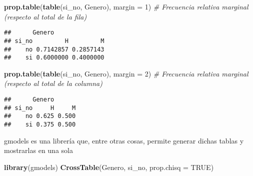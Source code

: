 \documentclass[]{article}
\newenvironment{Shaded}{\begin{snugshade}}{\end{snugshade}}
\newcommand{\CommentTok}[1]{\textcolor[rgb]{0.56,0.35,0.01}{\textit{#1}}}
\newcommand{\DataTypeTok}[1]{\textcolor[rgb]{0.13,0.29,0.53}{#1}}
\newcommand{\DecValTok}[1]{\textcolor[rgb]{0.00,0.00,0.81}{#1}}
\newcommand{\KeywordTok}[1]{\textcolor[rgb]{0.13,0.29,0.53}{\textbf{#1}}}
\newcommand{\NormalTok}[1]{#1}
\newcommand{\OtherTok}[1]{\textcolor[rgb]{0.56,0.35,0.01}{#1}}
\begin{document}
\begin{Shaded}
\begin{Highlighting}[]
\KeywordTok{prop.table}\NormalTok{(}\KeywordTok{table}\NormalTok{(si_no, Genero), }\DataTypeTok{margin =} \DecValTok{1}\NormalTok{) }\CommentTok{# Frecuencia relativa marginal (respecto al total de la fila)}
\end{Highlighting}
\end{Shaded}

\begin{verbatim}
##      Genero
## si_no         H         M
##    no 0.7142857 0.2857143
##    si 0.6000000 0.4000000
\end{verbatim}

\begin{Shaded}
\begin{Highlighting}[]
\KeywordTok{prop.table}\NormalTok{(}\KeywordTok{table}\NormalTok{(si_no, Genero), }\DataTypeTok{margin =} \DecValTok{2}\NormalTok{) }\CommentTok{# Frecuencia relativa marginal (respecto al total de la columna)}
\end{Highlighting}
\end{Shaded}

\begin{verbatim}
##      Genero
## si_no     H     M
##    no 0.625 0.500
##    si 0.375 0.500
\end{verbatim}

gmodels es una librería que, entre otras cosas, permite generar dichas
tablas y mostrarlas en una sola

\begin{Shaded}
\begin{Highlighting}[]
\KeywordTok{library}\NormalTok{(gmodels)}
\KeywordTok{CrossTable}\NormalTok{(Genero, si_no, }\DataTypeTok{prop.chisq =} \OtherTok{TRUE}\NormalTok{)}
\end{Highlighting}
\end{Shaded}
\end{document}
